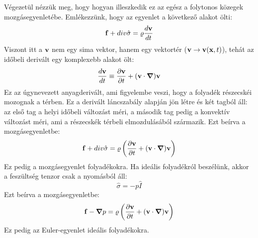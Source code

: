 \documentclass[../main.tex]{subfiles}
\begin{document}
Végezetül nézzük meg, hogy hogyan illeszkedik ez az egész a folytonos közegek mozgásegyenletébe. Emlékezzünk, hogy az egyenlet a következő alakot ölti:
\begin{equation}
    \bold{f} + div \hat{\sigma} = \varrho \frac{d \bold{v}}{dt}
\end{equation}
Viszont itt a $\bold{v}$ nem egy sima vektor, hanem egy vektortér ($\bold{v} \rightarrow \bold{v}(\bold{x}, t)$), tehát az időbeli derivált egy komplexebb alakot ölt:
\begin{equation}
    \frac{d \bold{v}}{dt} \equiv \frac{\partial \bold{v}}{\partial t} + (\bold{v} \cdot \boldsymbol{\nabla}) \bold{v}
\end{equation}
Ez az úgynevezett anyagderivált, ami figyelembe veszi, hogy a folyadék részecskéi mozognak a térben. Ez a derivált láncszabály alapján jön létre és két tagból áll: az első tag a helyi időbeli változást méri,
a második tag pedig a konvektív változást méri, ami a részecskék térbeli elmozdulásából származik. Ezt beírva a mozgásegyenletbe:
\begin{equation}
    \bold{f} + div \hat{\sigma} = \varrho \left(\frac{\partial \bold{v}}{\partial t} + (\bold{v} \cdot \boldsymbol{\nabla}) \bold{v}\right)
\end{equation}
Ez pedig a mozgásegyenlet folyadékokra. Ha ideális folyadékról beszélünk, akkor a feszültség tenzor csak a nyomásból áll:
\begin{equation}
    \hat{\sigma} = - p \hat{I}
\end{equation}
Ezt beírva a mozgásegyenletbe:
\begin{equation}
    \bold{f} - \boldsymbol{\nabla} p = \varrho \left(\frac{\partial \bold{v}}{\partial t} + (\bold{v} \cdot \boldsymbol{\nabla}) \bold{v}\right)
\end{equation}
Ez pedig az Euler-egyenlet ideális folyadékokra.
\end{document}
